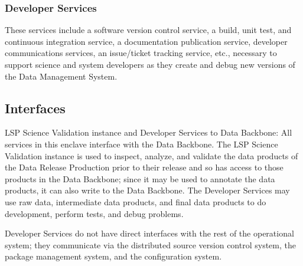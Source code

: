 \documentclass[DM,toc,lsstdraft]{lsstdoc}
\begin{document}
\subsubsection{Developer Services}\label{developer-services}

These services include a software version control service, a build, unit test, and continuous integration service, a documentation publication service, developer communications services, an issue/ticket tracking service, etc., necessary to support science and system developers as they create and debug new versions of the Data Management System.

\subsection{Interfaces}\label{ncsa-development-integration-interfaces}

LSP Science Validation instance and Developer Services to Data Backbone:
All services in this enclave interface with the Data Backbone.  The LSP
Science Validation instance is used to inspect, analyze, and validate the data
products of the Data Release Production prior to their release and so has
access to those products in the Data Backbone; since it may be used to annotate
the data products, it can also write to the Data Backbone.  The Developer
Services may use raw data, intermediate data products, and final
data products to do development, perform tests, and debug problems.

Developer Services do not have direct interfaces with the rest of the
operational system; they communicate via the distributed source version control
system, the package management system, and the configuration system.







\end{document}
